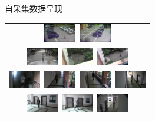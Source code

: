 \begin{frame}{自采集数据呈现}
    \begin{table}
        \centering
        \begin{tabular}{c}
            \includegraphics[width=14mm]{figures/1-1}~\includegraphics[width=14mm]{figures/1-2} \\
            \includegraphics[width=14mm]{figures/1-4}~\includegraphics[width=14mm]{figures/1-5}~\includegraphics[width=14mm]{figures/1-6} \\
            \includegraphics[width=14mm]{figures/2-1}~\includegraphics[width=14mm]{figures/2-2}~\includegraphics[width=14mm]{figures/2-3}~\includegraphics[width=14mm]{figures/2-4} \\
            \includegraphics[width=14mm]{figures/3-1}~\includegraphics[width=14mm]{figures/3-2}~\includegraphics[width=14mm]{figures/3-3} \\

\end{tabular}
\end{table}
\end{frame}

